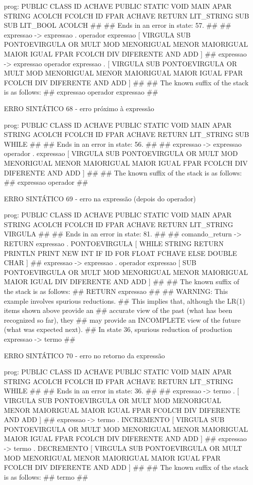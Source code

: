 \documentclass[12pt,a4paper,twoside]{report}
\begin{document}
\begin{terminal}
{prog: PUBLIC CLASS ID ACHAVE PUBLIC STATIC VOID MAIN APAR STRING ACOLCH FCOLCH ID FPAR ACHAVE RETURN LIT_STRING SUB SUB LIT_BOOL ACOLCH 
##
## Ends in an error in state: 57.
##
## expressao -> expressao . operador expressao [ VIRGULA SUB PONTOEVIRGULA OR MULT MOD MENORIGUAL MENOR MAIORIGUAL MAIOR IGUAL FPAR FCOLCH DIV DIFERENTE AND ADD ]
## expressao -> expressao operador expressao . [ VIRGULA SUB PONTOEVIRGULA OR MULT MOD MENORIGUAL MENOR MAIORIGUAL MAIOR IGUAL FPAR FCOLCH DIV DIFERENTE AND ADD ]
##
## The known suffix of the stack is as follows:
## expressao operador expressao 
##

ERRO SINTÁTICO 68 - erro próximo à expressão

prog: PUBLIC CLASS ID ACHAVE PUBLIC STATIC VOID MAIN APAR STRING ACOLCH FCOLCH ID FPAR ACHAVE RETURN LIT_STRING SUB WHILE 
##
## Ends in an error in state: 56.
##
## expressao -> expressao operador . expressao [ VIRGULA SUB PONTOEVIRGULA OR MULT MOD MENORIGUAL MENOR MAIORIGUAL MAIOR IGUAL FPAR FCOLCH DIV DIFERENTE AND ADD ]
##
## The known suffix of the stack is as follows:
## expressao operador 
##

ERRO SINTÁTICO 69 - erro na expressão (depois do operador)

prog: PUBLIC CLASS ID ACHAVE PUBLIC STATIC VOID MAIN APAR STRING ACOLCH FCOLCH ID FPAR ACHAVE RETURN LIT_STRING VIRGULA 
##
## Ends in an error in state: 81.
##
## comando_return -> RETURN expressao . PONTOEVIRGULA [ WHILE STRING RETURN PRINTLN PRINT NEW INT IF ID FOR FLOAT FCHAVE ELSE DOUBLE CHAR ]
## expressao -> expressao . operador expressao [ SUB PONTOEVIRGULA OR MULT MOD MENORIGUAL MENOR MAIORIGUAL MAIOR IGUAL DIV DIFERENTE AND ADD ]
##
## The known suffix of the stack is as follows:
## RETURN expressao 
##
## WARNING: This example involves spurious reductions.
## This implies that, although the LR(1) items shown above provide an
## accurate view of the past (what has been recognized so far), they
## may provide an INCOMPLETE view of the future (what was expected next).
## In state 36, spurious reduction of production expressao -> termo 
##

ERRO SINTÁTICO 70 - erro no retorno da expressão

prog: PUBLIC CLASS ID ACHAVE PUBLIC STATIC VOID MAIN APAR STRING ACOLCH FCOLCH ID FPAR ACHAVE RETURN LIT_STRING WHILE 
##
## Ends in an error in state: 36.
##
## expressao -> termo . [ VIRGULA SUB PONTOEVIRGULA OR MULT MOD MENORIGUAL MENOR MAIORIGUAL MAIOR IGUAL FPAR FCOLCH DIV DIFERENTE AND ADD ]
## expressao -> termo . INCREMENTO [ VIRGULA SUB PONTOEVIRGULA OR MULT MOD MENORIGUAL MENOR MAIORIGUAL MAIOR IGUAL FPAR FCOLCH DIV DIFERENTE AND ADD ]
## expressao -> termo . DECREMENTO [ VIRGULA SUB PONTOEVIRGULA OR MULT MOD MENORIGUAL MENOR MAIORIGUAL MAIOR IGUAL FPAR FCOLCH DIV DIFERENTE AND ADD ]
##
## The known suffix of the stack is as follows:
## termo 
##

}
\end{terminal}
\end{document}
